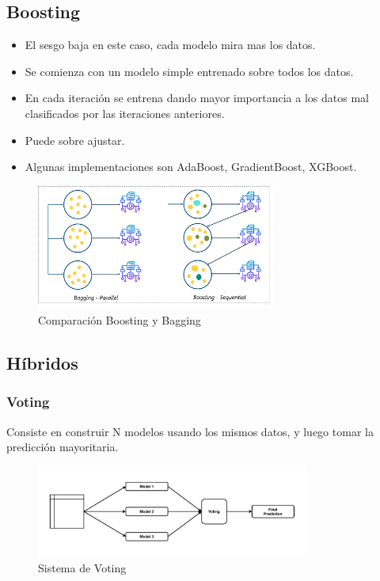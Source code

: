 \documentclass[titlepage,a4paper]{article}
\begin{document}
\subsection{Boosting}
\begin{itemize}
    \item El sesgo baja en este caso, cada modelo mira mas los datos.
    \item Se comienza con un modelo simple entrenado sobre todos los datos.
    \item En cada iteración se entrena dando mayor importancia a los datos mal clasificados por las iteraciones anteriores.
    \item Puede sobre ajustar.
    \item Algunas implementaciones son AdaBoost, GradientBoost, XGBoost.
\end{itemize}

\begin{figure}[!htb]
    \centering
    \includegraphics[width=0.7\textwidth]{imagenesResumen/Boosting.png}
    \caption{Comparación Boosting y Bagging}
\end{figure}

\subsection{Híbridos}
\subsubsection{Voting}
Consiste en construir N modelos usando los mismos datos, y luego tomar la predicción mayoritaria.

\begin{figure}[!htb]
    \centering
    \includegraphics[width=0.8\textwidth]{imagenesResumen/Voting.png}
    \caption{Sistema de Voting}
\end{figure}
\end{document}
